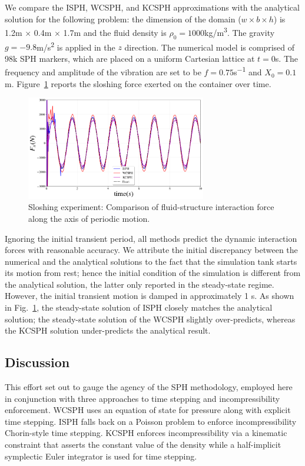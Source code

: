 We compare the ISPH, WCSPH, and KCSPH approximations with the analytical solution for the following problem: the dimension of the domain ($w \times b \times h$) is  1.2\si{m} $\times$ 0.4\si{m} $\times$ 1.7\si{m} and the  fluid density is $\rho_0=1000$\si{kg/m^3}. The gravity $g=-9.8$\si{m/s^2} is applied in the  $z$ direction. The numerical model is comprised of 98k SPH markers, which are placed on a uniform Cartesian lattice at $t=0$\si{s}. The frequency and amplitude of the vibration are set to be $f=0.75$\si{s^{-1}} and $X_0=0.1$\si{m}.  Figure~\ref{fig:Sloshing} reports the sloshing force exerted on the container over time. 
\begin{figure}[H]
	\begin{center}
		\includegraphics[width=0.7\textwidth]{images/SPH_Comparison/Figure_Sloshing.png}
	\end{center}
	\caption{Sloshing experiment: Comparison of fluid-structure interaction force along the axis of periodic motion.}
	\label{fig:Sloshing}
\end{figure}

Ignoring the initial transient period, all methods predict the dynamic interaction forces with reasonable accuracy. We attribute the initial discrepancy between the numerical and the analytical solutions to the fact that the simulation tank starts its motion from rest; hence the initial condition of the simulation is different from the analytical solution, the latter only reported in the steady-state regime. However, the initial transient motion is damped in approximately 1 \si{s}. As shown in Fig.~\ref{fig:Sloshing}, the steady-state solution of ISPH closely matches the analytical solution; the steady-state solution of the WCSPH slightly over-predicts, whereas the KCSPH solution under-predicts the analytical result.

\subsection{Discussion}\label{sec:discussion_SPHs}
This effort set out to gauge the agency of the SPH methodology, employed here in conjunction with three approaches to time stepping and incompressibility enforcement. WCSPH uses an equation of state for pressure along with explicit time stepping. ISPH falls back on a Poisson problem to enforce incompressibility Chorin-style time stepping. KCSPH enforces incompressibility via a kinematic constraint that asserts the constant value of the density while a half-implicit symplectic Euler integrator is used for time stepping. 

